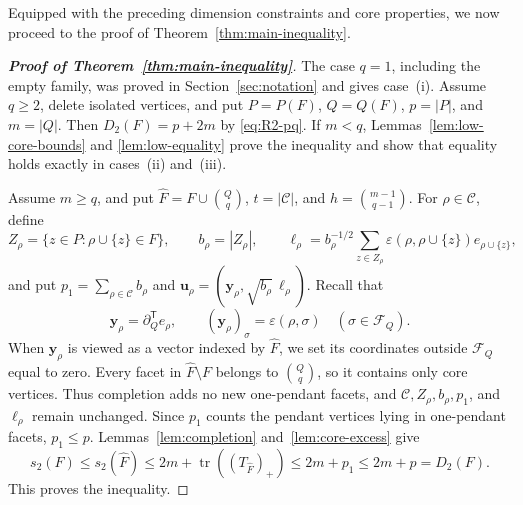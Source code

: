 \documentclass[11pt]{article}
\newcommand{\tr}{\operatorname{tr}}
\newcommand{\bd}{\partial}
\newcommand{\calC}{\mathcal{C}}
\newcommand{\calF}{\mathcal{F}}
\begin{document}
Equipped with the preceding dimension constraints and core properties, we now proceed to the proof of Theorem~\ref{thm:main-inequality}.
\begin{proof}[\textup{\textbf{Proof of Theorem~\ref{thm:main-inequality}}}]
The case \(q=1\), including the empty family, was proved in Section~\ref{sec:notation} and gives case~\textup{(i)}. Assume \(q\geq2\), delete isolated vertices, and put \(P=P(F)\), \(Q=Q(F)\), \(p=|P|\), and \(m=|Q|\). Then \(D_2(F)=p+2m\) by \eqref{eq:R2-pq}. If \(m<q\), Lemmas~\ref{lem:low-core-bounds} and \ref{lem:low-equality} prove the inequality and show that equality holds exactly in cases~\textup{(ii)} and~\textup{(iii)}.

Assume \(m\geq q\), and put \(\widehat F=F\cup\binom Qq\), \(t=|\calC|\), and \(h=\binom{m-1}{q-1}\). For \(\rho\in\calC\), define
\[
Z_\rho=\{z\in P:\rho\cup\{z\}\in F\},\qquad b_\rho=|Z_\rho|,\qquad
\boldsymbol{\ell}_\rho=b_\rho^{-1/2}\sum_{z\in Z_\rho}\varepsilon(\rho,\rho\cup\{z\})e_{\rho\cup\{z\}},
\]
and put \(p_1=\sum_{\rho\in\calC}b_\rho\) and \(\mathbf u_\rho=(\mathbf y_\rho,\sqrt{b_\rho}\,\boldsymbol{\ell}_\rho)\).  Recall that
\[
\mathbf y_\rho=\bd_Q^{\mathsf T}e_\rho,
\qquad
(\mathbf y_\rho)_\sigma=\varepsilon(\rho,\sigma)
\quad(\sigma\in\calF_Q).
\]
When \(\mathbf y_\rho\) is viewed as a vector indexed by \(\widehat F\),
we set its coordinates outside \(\calF_Q\) equal to zero. Every facet
in \(\widehat F\setminus F\) belongs to \(\binom Qq\), so it contains
only core vertices. Thus completion adds no new one-pendant facets, and
\(\calC,Z_\rho,b_\rho,p_1\), and
\(\boldsymbol{\ell}_\rho\) remain unchanged.
 Since \(p_1\) counts the pendant vertices lying in one-pendant facets, \(p_1\leq p\).
 Lemmas~\ref{lem:completion} and~\ref{lem:core-excess} give
\begin{equation}\label{eq:main-high-chain}
s_2(F)\leq s_2(\widehat F)\leq2m+\tr((T_{\widehat F})_+)
\leq2m+p_1\leq2m+p=D_2(F).
\end{equation}
This proves the inequality.


\end{proof}
\end{document}
